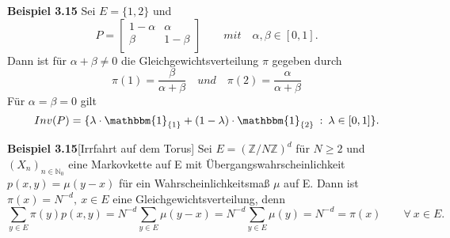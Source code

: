 \textbf{Beispiel 3.15}
Sei $E = \lbrace 1,2 \rbrace$ und 
\begin{equation*}
P=
\begin{bmatrix}
 1- \alpha & \alpha \\
 \beta & 1-\beta \\
\end{bmatrix}
\qquad mit \quad \alpha , \beta \in [0,1].
\end{equation*}
Dann ist für $\alpha + \beta \neq 0$ die Gleichgewichtsverteilung $\pi$ gegeben durch
\begin{equation*}
\pi(1) = \dfrac{\beta}{\alpha + \beta } \quad und \quad \pi(2) = \dfrac{\alpha}{\alpha + \beta }
\end{equation*}
Für $\alpha = \beta = 0$ gilt
\begin{equation*}
Inv(P) = \lbrace \lambda \cdot \mathbbm{1}_{\lbrace 1 \rbrace} + (1-\lambda) \cdot \mathbbm{1}_{\lbrace 2 \rbrace} \: : \: \lambda \in [0,1] \rbrace.
\end{equation*}

\textbf{Beispiel 3.15}[Irrfahrt auf dem Torus]
Sei $E = (\mathbb{Z}/N \mathbb{Z})^{d}$ für $N \geq 2$ und $(X_{n})_{n \in \mathbb{N}_{0}}$ eine Markovkette auf E mit Übergangswahrscheinlichkeit $p(x,y) = \mu (y-x)$ für ein Wahrscheinlichkeitsmaß $\mu$ auf E. Dann ist $\pi(x) = N^{-d}, \: x \in E$ eine Gleichgewichtsverteilung, denn
\begin{equation*}
\sum_{y \in E} \pi(y)p(x,y) = N^{-d} \sum_{y \in E} \mu (y-x) = N^{-d} \sum_{y \in E} \mu (y) =  N^{-d} = \pi (x) \qquad \forall \: x \in E.
\end{equation*}

